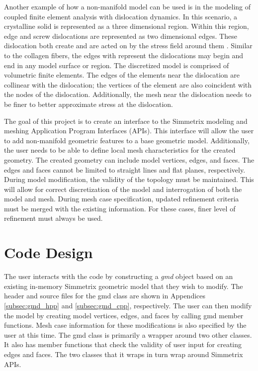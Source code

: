 \documentclass[a4paper, 12pt]{article}
\begin{document}
Another example of how a non-manifold model can be used is in the 
modeling of coupled finite element analysis with dislocation dynamics. 
In this scenario, a crystalline solid is represented as a three dimensional 
region. Within this region, edge and screw dislocations are represented
as two dimensional edges. These dislocation both create and are acted on
by the stress field around them \cite{askeland}. Similar to the collagen 
fibers, the edges with represent the dislocations may begin and end in
any model surface or region. The discretized model is comprised of 
volumetric finite elements. The edges of the elements near the dislocation 
are collinear with the dislocation; the vertices of the element are also
coincident with the nodes of the dislocation. Additionally, the mesh near
the dislocation needs to be finer to better approximate stress at the
dislocation.

The goal of this project is to create an interface to the Simmetrix 
modeling and meshing Application Program Interfaces (APIs). This 
interface will allow the user to add non-manifold geometric features
to a base geometric model. Additionally, the user needs to be able
to define local mesh characteristics for the created geometry. 
The created geometry can include model vertices, edges, and faces.
The edges and faces cannot be limited to straight lines and flat 
planes, respectively. During model modification, the validity of 
the topology must be maintained. This will allow for correct 
discretization of the model and interrogation of both the model and mesh.
During mesh case specification, updated refinement criteria must be merged 
with the existing information. For these cases,
finer level of refinement must always be used. 

\section{Code Design} \label{sec:design}
The user interacts with the code by constructing a \emph{gmd}
object based on an existing in-memory Simmetrix geometric model that they 
wish to modify. The header and source files for the gmd class 
are shown in Appendices \ref{subsec:gmd_hpp} and \ref{subsec:gmd_cpp}, 
respectively.  The user can then modify the model by 
creating model vertices, edges, and faces by calling
gmd member functions. Mesh case information for these 
modifications is also specified by the user at this time.
The gmd class is primarily a wrapper around two other classes. It also
has member functions that check the validity of user input for creating 
edges and faces. The two classes that it 
wraps in turn wrap around Simmetrix APIs.
\end{document}
